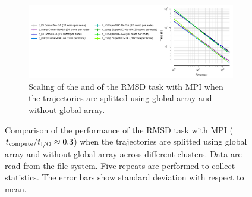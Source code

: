 \begin{figure}[ht!]
\begin{subfigure} {.8\textwidth}
  \includegraphics[width=\linewidth]{figures/Clusters_IO_compute_scaling_splitting.pdf}
  \caption{Scaling of the \tcomp and \tIO of the RMSD task with MPI when the trajectories are splitted using global array and without global array.}
  \label{fig:compute-IO-scaling-clusters-splitting}
\end{subfigure}
%
\caption{Comparison of the performance of the RMSD task with MPI (${t}_{\text{compute}}/{t}_{\text{I/O}} \approx 0.3$) when the trajectories are splitted using global 
array and without global array across different clusters. Data are read from the file system. Five repeats are performed to collect statistics. 
The error bars show standard deviation with respect to mean.}
\label{fig:MPI-splitting-clusters}
\end{figure} 


